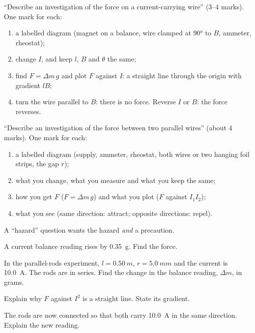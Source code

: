 \begin{examtip}[breakable]
``Describe an investigation of the force on a current-carrying wire'' (3--4 marks). One mark for
each:
\begin{enumerate}
  \item a labelled diagram (magnet on a balance, wire clamped at \ang{90} to $B$, ammeter,
        rheostat);
  \item change $I$, and keep $l$, $B$ and $\theta$ the same;
  \item find $F = \Delta m\, g$ and plot $F$ against $I$: a straight line through the origin with
        gradient $lB$;
  \item turn the wire parallel to $B$: there is no force. Reverse $I$ or $B$: the force reverses.
\end{enumerate}
``Describe an investigation of the force between two parallel wires'' (about 4 marks). One mark
for each:
\begin{enumerate}
  \item a labelled diagram (supply, ammeter, rheostat, both wires or two hanging foil strips, the
        gap $r$);
  \item what you change, what you measure and what you keep the same;
  \item how you get $F$ ($F = \Delta m\, g$) and what you plot ($F$ against $I_1 I_2$);
  \item what you see (same direction: attract; opposite directions: repel).
\end{enumerate}
A ``hazard'' question wants the hazard \emph{and} a precaution.
\end{examtip}

\begin{quickcheck}
  \item A current balance reading rises by \qty{0.35}{g}. Find the force.
  \item In the parallel-rods experiment, $l = \qty{0.50}{m}$, $r = \qty{5.0}{mm}$ and the current
        is \qty{10.0}{A}. The rods are in series. Find the change in the balance reading,
        $\Delta m$, in grams.\label{ch2:qc:rods}
  \item Explain why $F$ against $I^2$ is a straight line. State its gradient.
  \item The rods are now connected so that both carry \qty{10.0}{A} in the same direction. Explain
        the new reading.
\end{quickcheck}

